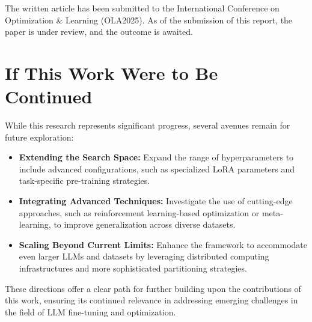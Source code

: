 The written article has been submitted to the International Conference on Optimization \& Learning (OLA2025). As of the submission of this report, the paper is under review, and the outcome is awaited.

\section{If This Work Were to Be Continued}
\label{sec:further_work}
While this research represents significant progress, several avenues remain for future exploration:
\begin{itemize}
    \item \textbf{Extending the Search Space:} Expand the range of hyperparameters to include advanced configurations, such as specialized LoRA parameters and task-specific pre-training strategies.
    \item \textbf{Integrating Advanced Techniques:} Investigate the use of cutting-edge approaches, such as reinforcement learning-based optimization or meta-learning, to improve generalization across diverse datasets.
    \item \textbf{Scaling Beyond Current Limits:} Enhance the framework to accommodate even larger LLMs and datasets by leveraging distributed computing infrastructures and more sophisticated partitioning strategies.
\end{itemize}

These directions offer a clear path for further building upon the contributions of this work, ensuring its continued relevance in addressing emerging challenges in the field of LLM fine-tuning and optimization.
